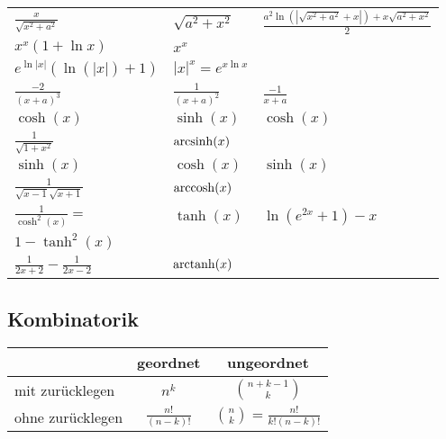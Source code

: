 {\begin{tabular}{l | l | l}
    $\frac{x}{\sqrt{x^2 + a^2}}$                                      & $\sqrt{a^2 + x^2}$      & $\frac{a^2 \ln(| \sqrt{x^2 + a^2} +x|) + x \sqrt{a^2 + x^2}}{2}$\\
    $x^x (1 + \ln x)$                                                 & $x^x$                   & \\
    $e^{\ln |x|}(\ln(|x|) + 1)$                                       & $|x|^x = e^{x \ln x}$   & \\
    $\frac{-2}{(x + a)^3}$                                            & $\frac{1}{(x + a)^2}$   & $\frac{-1}{x + a}$\\
    $\cosh(x)$                                                        & $\sinh(x)$              & $\cosh(x)$\\
    $\frac{1}{\sqrt{1+x^2}}$                                          & $\operatorname{arcsinh}(x)$           & \\
    $\sinh(x)$                                                        & $\cosh(x)$              & $\sinh(x)$\\
    $\frac{1}{\sqrt{x-1}\sqrt{x+1}}$                                  & $\operatorname{arccosh}(x)$           & \\
    $\frac{1}{\cosh^2(x)} =$                                          & $\tanh(x)$              & $\ln(e^{2x} + 1) - x$\\
    $1 - \tanh^2(x)$                                                  &                         & \\
    $\frac{1}{2x+2} - \frac{1}{2x - 2}$                               & $\operatorname{arctanh}(x)$           & \\
\end{tabular}}


\subsection{Kombinatorik}
\begin{tabular}{l | c | c}
    & geordnet & ungeordnet\\\hline
    mit zurücklegen & $n^k$ & ${n + k - 1 \choose k}$\\
    ohne zurücklegen & $\frac{n!}{(n - k)!}$ & ${n \choose k} = \frac{n!}{k!(n - k)!}$
\end{tabular}
